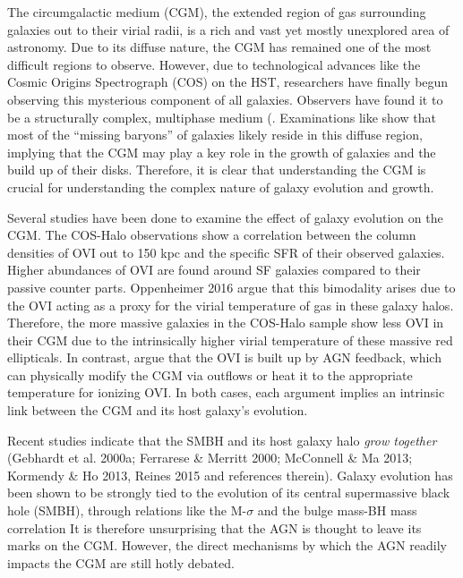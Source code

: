 \documentclass[]{emulateapj}
\begin{document}
The circumgalactic medium (CGM), the extended region of gas surrounding galaxies out to their virial radii, is a rich and vast yet mostly unexplored area of astronomy. Due to its diffuse nature, the CGM has remained one of the most difficult regions to observe. However, due to technological advances like the Cosmic Origins Spectrograph (COS) on the HST, researchers have finally begun observing this mysterious component of all galaxies. Observers have found it to be a structurally complex, multiphase medium (\citep{Tumlinson2011,Werk2012,Werk2013a,Werk2016,Tumlinson2017}. Examinations like \cite{Werk2014} show that most of the ``missing baryons'' of galaxies likely reside in this diffuse region, implying that the CGM may play a key role in the growth of galaxies and the build up of their disks. Therefore, it is clear that understanding the CGM is crucial for understanding the complex nature of galaxy evolution and growth. 

Several studies have been done to examine the effect of galaxy evolution on the CGM. The COS-Halo observations show a correlation between the column densities of OVI out to 150 kpc and the specific SFR of their observed galaxies. Higher abundances of OVI are found around SF galaxies compared to their passive counter parts. Oppenheimer 2016 argue that this bimodality arises due to the OVI acting as a proxy for the virial temperature of gas in these galaxy halos. Therefore, the more massive galaxies in the COS-Halo sample show less OVI in their CGM due to the intrinsically higher virial temperature of these massive red ellipticals. In contrast, \cite{Suresh2017} argue that the OVI is built up by AGN feedback, which can physically modify the CGM via outflows or heat it to the appropriate temperature for ionizing OVI. In both cases, each argument implies an intrinsic link between the CGM and its host galaxy's evolution.

Recent studies indicate that the SMBH and its host galaxy halo \textit{grow together} (Gebhardt et al. 2000a; Ferrarese \& Merritt 2000; McConnell \& Ma 2013; Kormendy \& Ho 2013, Reines 2015 and references therein). Galaxy evolution has been shown to be strongly tied to the evolution of its central supermassive black hole (SMBH), through relations like the M-$\sigma$ and the bulge mass-BH mass correlation \citep{Ferrarese2000,Mcconnell2013} It is therefore unsurprising that the AGN is thought to leave its marks on the CGM. However, the direct mechanisms by which the AGN readily impacts the CGM are still hotly debated. 
\end{document}
